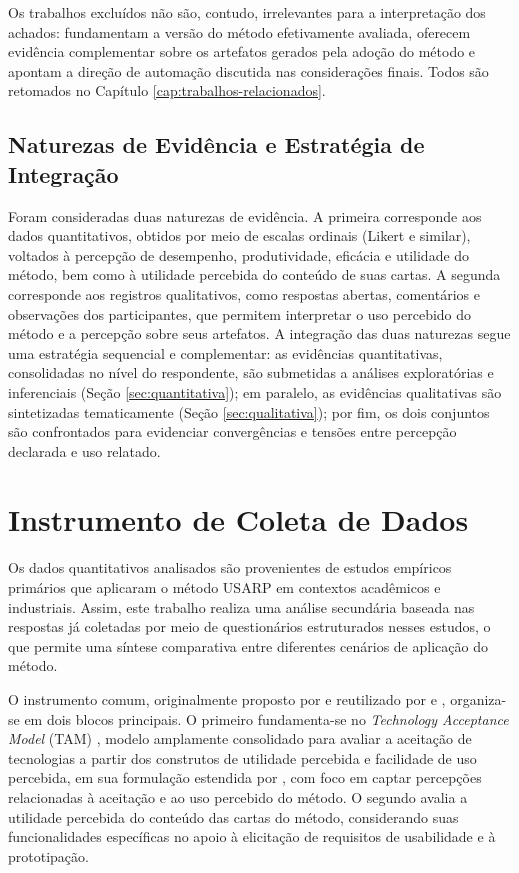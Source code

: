 Os trabalhos excluídos não são, contudo, irrelevantes para a interpretação dos achados:  fundamentam a versão do método efetivamente avaliada,  oferecem evidência complementar sobre os artefatos gerados pela adoção do método e  apontam a direção de automação discutida nas considerações finais. Todos são retomados no Capítulo \ref{cap:trabalhos-relacionados}.

\subsection{Naturezas de Evidência e Estratégia de Integração}
\label{sec:naturezas-evidencia}

Foram consideradas duas naturezas de evidência. A primeira corresponde aos dados quantitativos, obtidos por meio de escalas ordinais (Likert e similar), voltados à percepção de desempenho, produtividade, eficácia e utilidade do método, bem como à utilidade percebida do conteúdo de suas cartas. A segunda corresponde aos registros qualitativos, como respostas abertas, comentários e observações dos participantes, que permitem interpretar o uso percebido do método e a percepção sobre seus artefatos. A integração das duas naturezas segue uma estratégia sequencial e complementar: as evidências quantitativas, consolidadas no nível do respondente, são submetidas a análises exploratórias e inferenciais (Seção \ref{sec:quantitativa}); em paralelo, as evidências qualitativas são sintetizadas tematicamente (Seção \ref{sec:qualitativa}); por fim, os dois conjuntos são confrontados para evidenciar convergências e tensões entre percepção declarada e uso relatado.

\section{Instrumento de Coleta de Dados}
\label{sec:instrumento}

Os dados quantitativos analisados são provenientes de estudos empíricos primários que aplicaram o método USARP em contextos acadêmicos e industriais. Assim, este trabalho realiza uma análise secundária baseada nas respostas já coletadas por meio de questionários estruturados nesses estudos, o que permite uma síntese comparativa entre diferentes cenários de aplicação do método.

O instrumento comum, originalmente proposto por  e reutilizado por  e , organiza-se em dois blocos principais. O primeiro fundamenta-se no \textit{Technology Acceptance Model} (TAM) \cite{davis1989}, modelo amplamente consolidado para avaliar a aceitação de tecnologias a partir dos construtos de utilidade percebida e facilidade de uso percebida, em sua formulação estendida por , com foco em captar percepções relacionadas à aceitação e ao uso percebido do método. O segundo avalia a utilidade percebida do conteúdo das cartas do método, considerando suas funcionalidades específicas no apoio à elicitação de requisitos de usabilidade e à prototipação.

